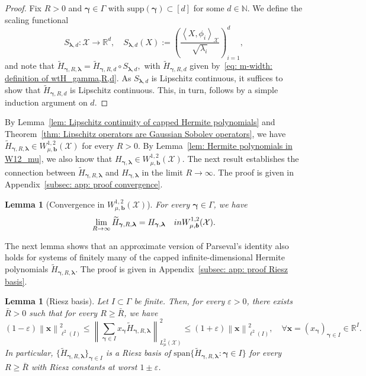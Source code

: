 \documentclass[namedate,webpdf]{ima-authoring-template-blank}
\newcommand*{\supp}{\mathrm{supp}}
\newcommand*{\spn}{\mathrm{span}}
\newcommand*{\nm}[1]{{\left\|#1\right \|}}
\newcommand*{\ip}[2]{\left\langle #1, #2 \right\rangle}
\newcounter{counter}
\numberwithin{counter}{section}
\numberwithin{equation}{section}
\theoremstyle{plain}
\newtheorem{lemma}[counter]{Lemma}
\theoremstyle{definition}
\newcommand*{\cX}{\mathcal{X}}
\newcommand*{\bbN}{\mathbb{N}}
\newcommand*{\bbR}{\mathbb{R}}
\newcommand*{\wtH}{\widetilde{H}}
\theoremstyle{thmstyletwo}
\begin{document}
\begin{proof}
    Fix \(R > 0\) and \(\bm{\gamma} \in \Gamma\) with \(\supp(\bm{\gamma}) \subset [d]\) for some \(d \in \bbN\). We define the scaling functional
    \[
    S_{\bm{\lambda}, d}: \cX \to \bbR^d, \quad S_{\bm{\lambda}, d}(X) := \left(\frac{\ip{X}{\phi_i}_{\cX}}{\sqrt{\lambda_i}}\right)_{i = 1}^d,
    \]
    and note that
    \(
    \wtH_{\bm{\gamma}, R, \bm{\lambda}} 
    = \wtH_{\bm{\gamma}, R, d} \circ S_{\bm{\lambda}, d},
    \)
    with \(\wtH_{\bm{\gamma}, R, d}\) given by~\eqref{eq: m-width: definition of wtH_gamma,R,d}.
    As \(S_{\bm{\lambda}, d}\) is Lipschitz continuous, it suffices to show that \(\wtH_{\bm{\gamma}, R, d}\) is Lipschitz continuous. This, in turn, follows by a simple induction argument on \(d\).
\end{proof}

By Lemma~\ref{lem: Lipschitz continuity of capped Hermite polynomials} and Theorem~\ref{thm: Lipschitz operators are Gaussian Sobolev operators}, we have \(\wtH_{\bm{\gamma}, R, \bm{\lambda}} \in W_{\mu, \bm{b}}^{1,2}(\cX) \) for every \(R>0\). By Lemma~\ref{lem: Hermite polynomials in W12_mu}, we also know that \(H_{\bm{\gamma}, \bm{\lambda}} \in W^{1,2}_{\mu, \bm{b}}(\cX) \). The next result establishes the connection between \(\wtH_{\bm{\gamma}, R, \bm{\lambda}}\) and \(H_{\bm{\gamma}, \bm{\lambda}}\) in the limit \(R \to \infty\). The proof is given in Appendix~\ref{subsec: app: proof convergence}.

\begin{lemma}[Convergence in \(W_{\mu, \bm{b}}^{1,2}(\cX)\)]
\label{lem: convergence in W^{1,2}}
    For every \(\bm{\gamma} \in \Gamma\), we have 
    \[
    \lim_{R \to \infty} \wtH_{\bm{\gamma}, R, \bm{\lambda}} 
    = H_{\bm{\gamma}, \bm{\lambda}} \quad \textup{in } W_{\mu, \bm{b}}^{1,2}(\cX).
    \]
\end{lemma}

The next lemma shows that an approximate version of Parseval's identity also holds for systems of finitely many of the capped infinite-dimensional Hermite polynomials \(\wtH_{\bm{\gamma}, R, \bm{\lambda}}\). The proof is given in Appendix~\ref{subsec: app: proof Riesz basis}.

\begin{lemma}[Riesz basis]
\label{lem: Riesz basis}
    Let \(I\subset\Gamma\) be finite. Then, for every \(\varepsilon>0\), there exists \(\bar{R} > 0\) such that for every \(R\geq \bar{R}\), we have
    \begin{equation}
    \label{eq: Riesz basis condition}
        (1-\varepsilon) \nm{\bm{x}}_{\ell^2(I)}^2 
        \leq \nm{\sum_{\bm{\gamma} \in I} x_{\bm{\gamma}} \wtH_{\bm{\gamma}, R, \bm{\lambda}}}_{L_{\mu}^2(\cX)}^2 \leq (1 + \varepsilon) \nm{\bm{x}}_{\ell^2(I)}^2,
        \quad \forall \bm{x} = (x_{\bm{\gamma}})_{\bm{\gamma} \in I} \in \bbR^I.
    \end{equation}
    In particular, \(\{\wtH_{\bm{\gamma}, R, \bm{\lambda}}\}_{\bm{\gamma} \in I}\) is a Riesz basis of \(\spn\{\wtH_{\bm{\gamma}, R, \bm{\lambda}}: \bm{\gamma} \in I\}\) for every \(R \geq \bar{R}\) with Riesz constants at worst \(1 \pm \varepsilon\).
\end{lemma}
\end{document}
